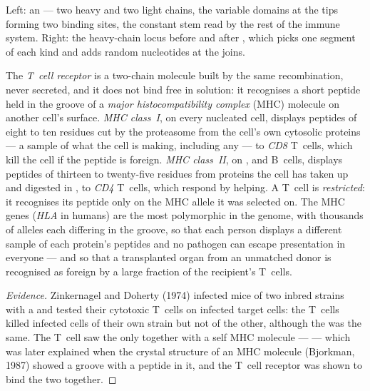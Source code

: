\begin{omfigure}
{\small Left: an  --- two heavy and two light chains, the
variable domains at the tips forming two binding sites, the constant
stem read by the rest of the immune system. Right: the heavy-chain
locus before and after , which picks one segment of
each kind and adds random nucleotides at the joins.}
\end{omfigure}

\begin{definition}\label{def:b3:adaptive-immunity:mhc}
The \emph{T~cell receptor} is a two-chain molecule built by the same
recombination, never secreted, and it does not bind  free in
solution: it recognises a short peptide held in the groove of a
\emph{major histocompatibility complex} (MHC) molecule on another
cell's surface. \emph{MHC class~I}, on every nucleated cell, displays
peptides of eight to ten residues cut by the proteasome from the
cell's own cytosolic proteins --- a sample of what the cell is making,
including any  --- to \emph{CD8} T~cells, which kill the cell if
the peptide is foreign. \emph{MHC class~II}, on ,
 and B~cells, displays peptides of thirteen to twenty-five
residues from proteins the cell has taken up and digested in
, to \emph{CD4} T~cells, which respond by helping. A T~cell
is \emph{restricted}: it recognises its peptide only on the MHC allele
it was selected on. The MHC genes (\emph{HLA} in humans) are the most
polymorphic in the genome, with thousands of alleles each differing in
the groove, so that each person displays a different sample of each
protein's peptides and no pathogen can escape presentation in everyone
--- and so that a transplanted organ from an unmatched donor is
recognised as foreign by a large fraction of the recipient's T~cells.
\end{definition}

\begin{proof}[Evidence]
Zinkernagel and Doherty (1974) infected mice of two inbred strains with
a  and tested their cytotoxic T~cells on infected target cells:
the T~cells killed infected cells of their own strain but not of the
other, although the  was the same. The T~cell saw the  only
together with a self MHC molecule --- \emph{} --- which
was later explained when the crystal structure of an MHC molecule
(Bjorkman, 1987) showed a groove with a peptide in it, and the T~cell
receptor was shown to bind the two together.
\end{proof}

